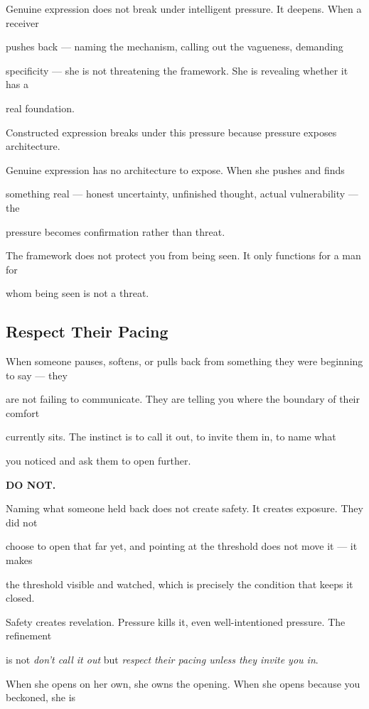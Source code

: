 \documentclass[12pt, a4paper]{article}
\begin{document}
Genuine expression does not break under intelligent pressure. It deepens. When a receiver

pushes back --- naming the mechanism, calling out the vagueness, demanding

specificity --- she is not threatening the framework. She is revealing whether it has a

real foundation.

Constructed expression breaks under this pressure because pressure exposes architecture.

Genuine expression has no architecture to expose. When she pushes and finds

something real --- honest uncertainty, unfinished thought, actual vulnerability --- the

pressure becomes confirmation rather than threat.

The framework does not protect you from being seen. It only functions for a man for

whom being seen is not a threat.

\subsection{Respect Their Pacing}

When someone pauses, softens, or pulls back from something they were beginning to say --- they

are not failing to communicate. They are telling you where the boundary of their comfort

currently sits. The instinct is to call it out, to invite them in, to name what

you noticed and ask them to open further.

\textbf{DO NOT.}

Naming what someone held back does not create safety. It creates exposure. They did not

choose to open that far yet, and pointing at the threshold does not move it --- it makes

the threshold visible and watched, which is precisely the condition that keeps it closed.

Safety creates revelation. Pressure kills it, even well-intentioned pressure. The refinement

is not \textit{don't call it out} but \textit{respect their pacing unless they invite you in}.

When she opens on her own, she owns the opening. When she opens because you beckoned, she is
\end{document}
